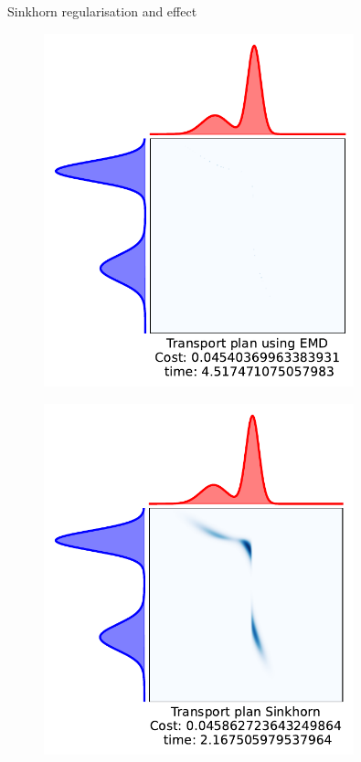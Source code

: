 \documentclass[pdf,aspectratio=169,10pt]{beamer}
\begin{document}
\begin{frame}{ Sinkhorn regularisation and effect}

\begin{minipage}{0.49\textwidth}  
\begin{figure}
        \includegraphics[width=0.8\textwidth]{../img/EMD_vs_S1.pdf}\hspace{2em}
    \end{figure}
\end{minipage}
\hfill
\begin{minipage}{0.49\textwidth}
\begin{figure}
        \includegraphics[width=0.8\textwidth]{../img/EMD_vs_S2.pdf}\hspace{2em}
    \end{figure}
\end{minipage}


\end{frame}
\end{document}
